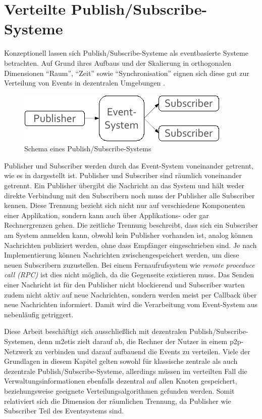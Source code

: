 \section{Verteilte Publish/Subscribe-Systeme}
\label{chap:grundlagen:pubsub}
Konzeptionell lassen sich Publish/Subscribe-Systeme als eventbasierte Systeme betrachten. Auf Grund ihres Aufbaus und der Skalierung  in orthogonalen Dimensionen \enquote{Raum}, \enquote{Zeit} sowie \enquote{Synchronisation} eignen sich diese gut zur Verteilung von Events in dezentralen Umgebungen \cite{PatrickTh2003Many, Cugola2002Using}.

\begin{figure}[htbp]
\centering
\includegraphics{grafics/pubsub_black_box.pdf}
\caption{Schema eines Publish/Subscribe-Systems}
\label{fig:pubsub_black_box}
\end{figure}

Publisher und Subscriber werden durch das Event-System voneinander getrennt, wie es in  dargestellt ist.  Publisher und Subscriber sind räumlich voneinander getrennt. Ein Publisher übergibt die Nachricht an das System und hält weder direkte Verbindung mit den Subscribern noch muss der Publisher alle Subscriber kennen. Diese Trennung bezieht sich nicht nur auf verschiedene Komponenten einer Applikation, sondern kann auch über Applikations- oder gar Rechnergrenzen gehen. Die zeitliche Trennung beschreibt, dass sich ein Subscriber am System anmelden kann, obwohl kein Publisher vorhanden ist, analog können Nachrichten publiziert werden, ohne dass Empfänger eingeschrieben sind. Je nach Implementierung können Nachrichten zwischengespeichert werden, um diese neuen Subscribern zuzustellen. Bei einem Fernaufrufsystem wie \emph{remote proceduce call (RPC)} \cite{Birrell1984Implementing} ist dies nicht möglich, da die Gegenseite existieren muss. Das Senden einer Nachricht ist für den Publisher nicht blockierend und Subscriber warten zudem nicht aktiv auf neue Nachrichten, sondern werden meist per Callback über neue Nachrichten informiert. Damit wird die Verarbeitung vom Event-System aus nebenläufig getriggert.

Diese Arbeit beschäftigt sich ausschließlich mit dezentralen Publish/Subscribe-Sys\-temen, denn \ac{m2etis} zielt darauf ab, die Rechner der Nutzer in einem p2p-Netzwerk zu verbinden und darauf aufbauend die Events zu verteilen. Viele der Grundlagen in diesem Kapitel gelten sowohl für klassische zentrale als auch dezentrale Publish/Subscribe-Systeme, allerdings müssen im verteilten Fall die Verwaltungsinformationen ebenfalls dezentral auf allen Knoten gespeichert, beziehungsweise geeignete Verteilungsalgorithmen gefunden werden. Somit relativiert sich die Dimension der räumlichen Trennung, da Publisher wie Subscriber Teil des Eventsystems sind.

